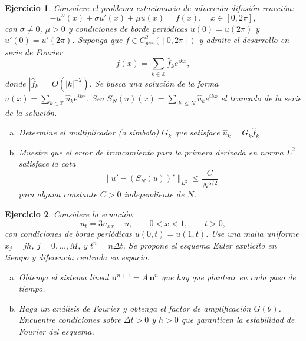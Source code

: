 \documentclass[12pt]{article}%
\newtheorem{exercise}{Ejercicio}
\begin{document}
\begin{exercise}Considere el problema estacionario de advección-difusión-reacción:$$-u''(x) + \sigma u'(x) + \mu u(x) = f(x), \quad x \in [0, 2\pi],$$con $\sigma \neq 0$, $\mu > 0$ y condiciones de borde periódicas $u(0) = u(2\pi)$ y $u'(0) = u'(2\pi)$. Suponga que $f \in C_{per}^2([0, 2\pi])$ y admite el desarrollo en serie de Fourier $$f(x) = \sum_{k\in\mathbb{Z}} \hat{f}_k e^{ikx},$$ donde $|\hat{f}_k| = O(|k|^{-2})$. Se busca una solución de la forma $u(x) = \sum_{k\in\mathbb{Z}} \hat{u}_k e^{ikx}$. Sea $S_N(u)(x) = \sum_{|k|\le N} \hat{u}_k e^{ikx}$ el truncado de la serie de la solución.
\begin{enumerate}[(a)]
\item Determine el multiplicador (o símbolo) $G_k$ que satisface $\hat{u}_k = G_k \hat{f}_k$.


\item Muestre que el error de truncamiento para la primera derivada en norma $L^2$ satisface la cota
\vspace{-0.3cm}
$$\|u' - (S_N(u))'\|_{L^2} \le \frac{C}{N^{5/2}}$$para alguna constante $C > 0$ independiente de $N$. 
\end{enumerate}
\end{exercise}

\vskip 0.5cm

\begin{exercise}
Considere la ecuación
\[
u_t= 3 u_{xx}-u,\qquad 0<x<1, \qquad t>0,
\]
con condiciones de borde periódicas $u(0,t)=u(1,t)$.
Use una malla uniforme $x_j=jh$, $j=0,\dots,M$, y $t^n=n\Delta t$. Se propone el esquema Euler explícito en tiempo y diferencia centrada en espacio.
\begin{enumerate}[(a)]
\item Obtenga el sistema lineal $\mathbf u^{n+1} = A\,\mathbf u^{n}$ que hay que plantear en cada paso de tiempo.


\item Haga un an\'alisis de Fourier y
obtenga el factor de amplificaci\'on $G(\theta)$. Encuentre condiciones sobre $\Delta t>0$ y $h>0$ que garanticen la estabilidad de Fourier del esquema.
\end{enumerate}
\end{exercise}
\end{document}
